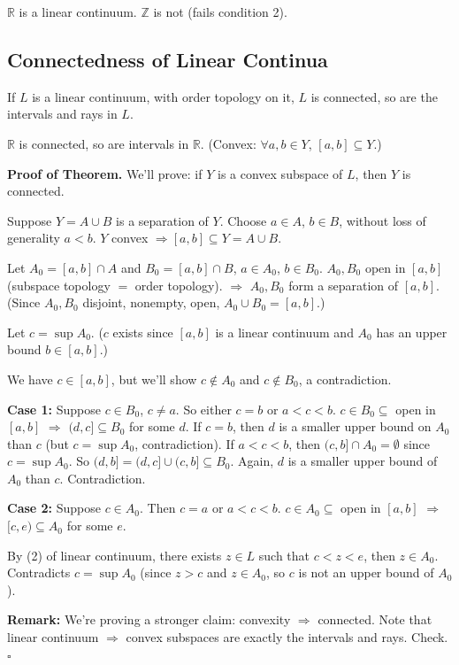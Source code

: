 \documentclass[11pt]{report}
\renewenvironment{proof}[1][Proof]{\noindent\textbf{#1.} }{\hfill$\square$\par\vspace{5pt}}
\begin{document}
\begin{exbox}
$\mathbb{R}$ is a linear continuum. $\mathbb{Z}$ is not (fails condition 2).
\end{exbox}

\subsection{Connectedness of Linear Continua}

\begin{thmbox}
If $L$ is a linear continuum, with order topology on it, $L$ is connected, so are the intervals and rays in $L$.
\end{thmbox}

\begin{corbox}
$\mathbb{R}$ is connected, so are intervals in $\mathbb{R}$. (Convex: $\forall a, b \in Y$, $[a, b] \subseteq Y$.)
\end{corbox}

\begin{proof}[Proof of Theorem]
We'll prove: if $Y$ is a convex subspace of $L$, then $Y$ is connected.

Suppose $Y = A \cup B$ is a separation of $Y$. Choose $a \in A$, $b \in B$, without loss of generality $a < b$. $Y$ convex $\Rightarrow [a, b] \subseteq Y = A \cup B$.

Let $A_0 = [a, b] \cap A$ and $B_0 = [a, b] \cap B$, $a \in A_0$, $b \in B_0$. $A_0, B_0$ open in $[a, b]$ (subspace topology $=$ order topology). $\Rightarrow$ $A_0, B_0$ form a separation of $[a, b]$. (Since $A_0, B_0$ disjoint, nonempty, open, $A_0 \cup B_0 = [a, b]$.)

Let $c = \sup A_0$. ($c$ exists since $[a, b]$ is a linear continuum and $A_0$ has an upper bound $b \in [a, b]$.)

We have $c \in [a, b]$, but we'll show $c \notin A_0$ and $c \notin B_0$, a contradiction.

\textbf{Case 1:} Suppose $c \in B_0$, $c \neq a$. So either $c = b$ or $a < c < b$. $c \in B_0 \subseteq$ open in $[a, b]$ $\Rightarrow$ $(d, c] \subseteq B_0$ for some $d$. If $c = b$, then $d$ is a smaller upper bound on $A_0$ than $c$ (but $c = \sup A_0$, contradiction). If $a < c < b$, then $(c, b] \cap A_0 = \emptyset$ since $c = \sup A_0$. So $(d, b] = (d, c] \cup (c, b] \subseteq B_0$. Again, $d$ is a smaller upper bound of $A_0$ than $c$. Contradiction.

\textbf{Case 2:} Suppose $c \in A_0$. Then $c = a$ or $a < c < b$. $c \in A_0 \subseteq$ open in $[a, b]$ $\Rightarrow$ $[c, e) \subseteq A_0$ for some $e$.

By (2) of linear continuum, there exists $z \in L$ such that $c < z < e$, then $z \in A_0$. Contradicts $c = \sup A_0$ (since $z > c$ and $z \in A_0$, so $c$ is not an upper bound of $A_0$).

\textbf{Remark:} We're proving a stronger claim: convexity $\Rightarrow$ connected. Note that linear continuum $\Rightarrow$ convex subspaces are exactly the intervals and rays. Check.
\end{proof}
\end{document}

